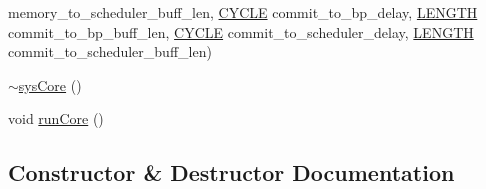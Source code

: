 \begin{DoxyCompactItemize}
memory\_\-to\_\-scheduler\_\-buff\_\-len, \hyperlink{global_2global_8h_a7e19a550ec11d1ed921deb20c22efb5b}{CYCLE} commit\_\-to\_\-bp\_\-delay, \hyperlink{global_2global_8h_ad7ec63c69447a2b630929c8e0197860d}{LENGTH} commit\_\-to\_\-bp\_\-buff\_\-len, \hyperlink{global_2global_8h_a7e19a550ec11d1ed921deb20c22efb5b}{CYCLE} commit\_\-to\_\-scheduler\_\-delay, \hyperlink{global_2global_8h_ad7ec63c69447a2b630929c8e0197860d}{LENGTH} commit\_\-to\_\-scheduler\_\-buff\_\-len)
\item 
\hyperlink{classsysCore_a4bc59653314c1a0f57a857e704b4b36c}{$\sim$sysCore} ()
\item 
void \hyperlink{classsysCore_a329e1539dcc7da668fb0d6237368922f}{runCore} ()
\end{DoxyCompactItemize}


\subsection{Constructor \& Destructor Documentation}
